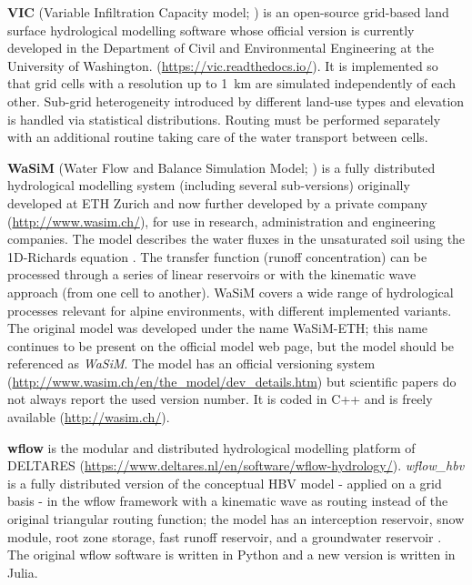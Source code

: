 \documentclass[10pt,a4paper]{article}
\begin{document}
\textbf{VIC} (Variable Infiltration Capacity model; \citealp{Liang1994a}) is an open-source grid-based land surface hydrological modelling software whose official version is currently developed in the Department of Civil and Environmental Engineering at the University of Washington. (\url{https://vic.readthedocs.io/}). It is implemented so that grid cells with a resolution up to 1~km are simulated independently of each other. Sub-grid heterogeneity introduced by different land-use types and elevation is handled via statistical distributions. Routing must be performed separately with an additional routine taking care of the water transport between cells.

\textbf{WaSiM} (Water Flow and Balance Simulation Model; \citealp{Schulla2007, Schulla2009}) is a fully distributed hydrological modelling system (including several sub-versions) originally developed at ETH Zurich and now further developed by a private company (\url{http://www.wasim.ch/}), for use in research, administration and engineering companies. The model describes the water fluxes in the unsaturated soil using the 1D-Richards equation \citep{Richards1931}. The transfer function (runoff concentration) can be processed through a series of linear reservoirs or with the kinematic wave approach (from one cell to another). WaSiM covers a wide range of hydrological processes relevant for alpine environments, with different implemented variants. The original model was developed under the name WaSiM-ETH; this name continues to be present on the official model web page, but the model should be referenced as \textit{WaSiM}. The model has an official versioning system (\url{http://www.wasim.ch/en/the\_model/dev\_details.htm}) but scientific papers do not always report the used version number. It is coded in C++ and is freely available (\url{http://wasim.ch/}).

\textbf{wflow} is the modular and distributed hydrological modelling platform of DELTARES (\url{https://www.deltares.nl/en/software/wflow-hydrology/}). \textit{wflow\_hbv} is a fully distributed version of the conceptual HBV model \citep{Lindstrm1997} - applied on a grid basis - in the wflow framework with a kinematic wave as routing instead of the original triangular routing function; the model has an interception reservoir, snow module, root zone storage, fast runoff reservoir, and a groundwater reservoir \citep{deBoerEuser2017}. The original wflow software is written in Python and a new version is written in Julia. 




\end{document}
